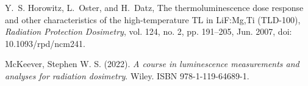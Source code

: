 
\begin{thebibliography}{999}

 Y.~S. Horowitz, L.~Oster, and H.~Datz, The thermoluminescence dose response and other characteristics of the high-temperature TL in LiF:Mg,Ti (TLD-100), \textit{Radiation Protection Dosimetry}, vol. 124, no. 2, pp. 191--205, Jun. 2007, doi: 10.1093/rpd/ncm241.

McKeever, Stephen W. S. (2022). \textit{A course in luminescence measurements and analyses for radiation dosimetry}. Wiley. ISBN 978-1-119-64689-1.


\end{thebibliography}